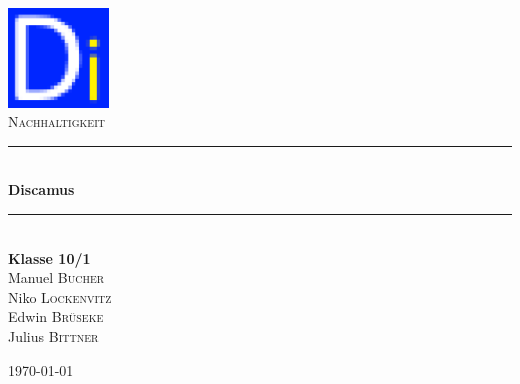 \begin{center}

\includegraphics[width=0.2\textwidth]{./ico}\\[1cm]

\textsc{\Large Nachhaltigkeit }\\[1.5cm]

\rule{\linewidth}{0.5mm} \\[0.4cm]
{ \Huge \bfseries Discamus}\\[0.4cm]
\rule{\linewidth}{0.7mm} \\[1.5cm]

\Large \textbf{Klasse 10/1} \\[1cm]

\large
Manuel \textsc{Bucher}\\
Niko \textsc{Lockenvitz}\\
Edwin \textsc{Brüseke}\\
Julius \textsc{Bittner}


\vfill


{\large \today}

\end{center}